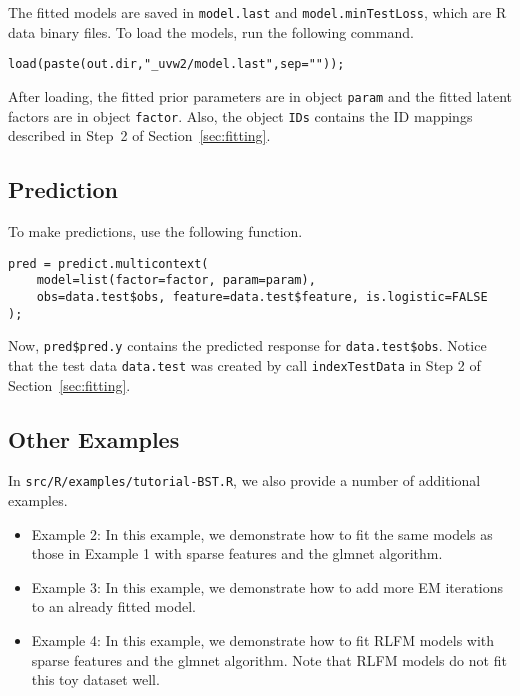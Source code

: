 \documentclass[10pt]{article}
\newcommand{\parahead}[1]{\vspace{0.15in}\noindent{\bf #1:}}
\begin{document}
\parahead{Model File}
The fitted models are saved in {\tt model.last} and {\tt model.minTestLoss}, which are R data binary files.  To load the models, run the following command.
{\small\begin{verbatim}
load(paste(out.dir,"_uvw2/model.last",sep=""));
\end{verbatim}}
\noindent After loading, the fitted prior parameters are in object {\tt param} and the fitted latent factors are in object {\tt factor}.  Also, the object {\tt IDs} contains the ID mappings described in Step~2 of Section~\ref{sec:fitting}.

\subsection{Prediction}

To make predictions, use the following function.
{\small\begin{verbatim}
pred = predict.multicontext(
    model=list(factor=factor, param=param), 
    obs=data.test$obs, feature=data.test$feature, is.logistic=FALSE
);
\end{verbatim}}
\noindent Now, {\tt pred\$pred.y} contains the predicted response for {\tt data.test\$obs}.  Notice that the test data {\tt data.test} was created by call {\tt indexTestData} in Step 2 of Section~\ref{sec:fitting}.

\subsection{Other Examples}

In {\tt src/R/examples/tutorial-BST.R}, we also provide a number of additional examples.
\begin{itemize}
\item Example 2: In this example, we demonstrate how to fit the same models as those in Example 1 with sparse features and the glmnet algorithm.
\item Example 3: In this example, we demonstrate how to add more EM iterations to an already fitted model.
\item Example 4: In this example, we demonstrate how to fit RLFM models with sparse features and the glmnet algorithm.  Note that RLFM models do not fit this toy dataset well.
\end{itemize}




\end{document}
